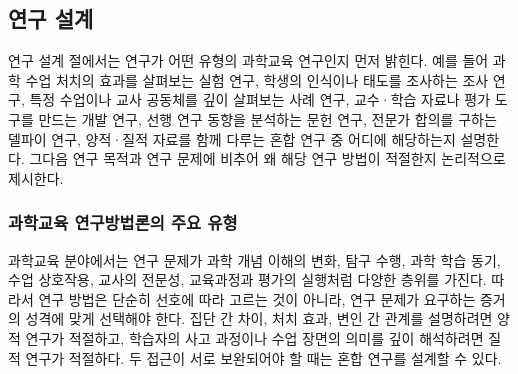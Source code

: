 \subsection{연구 설계}


연구 설계 절에서는 연구가 어떤 유형의 과학교육 연구인지 먼저 밝힌다.
예를 들어 과학 수업 처치의 효과를 살펴보는 실험 연구, 학생의 인식이나 태도를 조사하는 조사 연구, 특정 수업이나 교사 공동체를 깊이 살펴보는 사례 연구, 교수·학습 자료나 평가 도구를 만드는 개발 연구, 선행 연구 동향을 분석하는 문헌 연구, 전문가 합의를 구하는 델파이 연구, 양적·질적 자료를 함께 다루는 혼합 연구 중 어디에 해당하는지 설명한다.
그다음 연구 목적과 연구 문제에 비추어 왜 해당 연구 방법이 적절한지 논리적으로 제시한다.

\subsubsection{과학교육 연구방법론의 주요 유형}

과학교육 분야에서는 연구 문제가 과학 개념 이해의 변화, 탐구 수행, 과학 학습 동기, 수업 상호작용, 교사의 전문성, 교육과정과 평가의 실행처럼 다양한 층위를 가진다.
따라서 연구 방법은 단순히 선호에 따라 고르는 것이 아니라, 연구 문제가 요구하는 증거의 성격에 맞게 선택해야 한다.
집단 간 차이, 처치 효과, 변인 간 관계를 설명하려면 양적 연구가 적절하고, 학습자의 사고 과정이나 수업 장면의 의미를 깊이 해석하려면 질적 연구가 적절하다.
두 접근이 서로 보완되어야 할 때는 혼합 연구를 설계할 수 있다.

